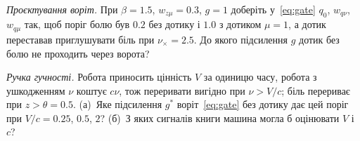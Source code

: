 \begin{exercise}[\lvlB]
\label{ex:14:6}
\emph{Проєктування воріт.} При $\beta=1.5$, $w_{z\mu}=0.3$, $g=1$ доберіть у~\eqref{eq:gate} $q_0$, $w_{q\nu}$, $w_{q\mu}$ так, щоб поріг болю був $0.2$ без дотику і $1.0$ з дотиком $\mu=1$, а дотик переставав приглушувати біль при $\nu_\times=2.5$. До якого підсилення $g$ дотик без болю не проходить через ворота?
\end{exercise}

\begin{exercise}[\lvlC]
\label{ex:14:7}
\emph{Ручка гучності.} Робота приносить цінність $V$ за одиницю часу, робота з ушкодженням $\nu$ коштує $c\nu$, тож переривати вигідно при $\nu>V/c$; біль перериває при $z>\theta=0.5$. (а)~Яке підсилення $g^*$ воріт~\eqref{eq:gate} без дотику дає цей поріг при $V/c=0.25$, $0.5$, $2$? (б)~З яких сигналів книги машина могла б оцінювати $V$ і $c$?
\end{exercise}
